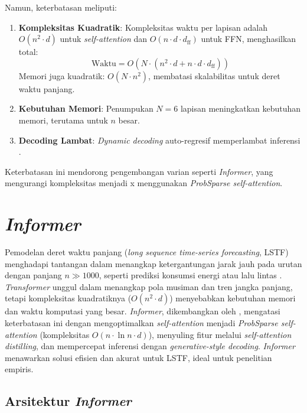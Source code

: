 Namun, keterbatasan meliputi:
\begin{enumerate}
    \item \textbf{Kompleksitas Kuadratik}: Kompleksitas waktu per lapisan adalah \( O(n^2 \cdot d) \) untuk \textit{self-attention} dan \( O(n \cdot d \cdot d_{\text{ff}}) \) untuk FFN, menghasilkan total:
    \begin{equation}
    \text{Waktu} = O(N \cdot (n^2 \cdot d + n \cdot d \cdot d_{\text{ff}}))
    \end{equation}
    Memori juga kuadratik: \( O(N \cdot n^2) \), membatasi skalabilitas untuk deret waktu panjang.
    \item \textbf{Kebutuhan Memori}: Penumpukan \( N=6 \) lapisan meningkatkan kebutuhan memori, terutama untuk \( n \) besar.
    \item \textbf{Decoding Lambat}: \textit{Dynamic decoding} auto-regresif memperlambat inferensi \citep{Zhou2021}.
\end{enumerate}
Keterbatasan ini mendorong pengembangan varian seperti \textit{Informer}, yang mengurangi kompleksitas menjadi x menggunakan \textit{ProbSparse self-attention}.

\section{\textit{Informer}}
\label{sec:informer}

Pemodelan deret waktu panjang (\textit{long sequence time-series forecasting}, LSTF) menghadapi tantangan dalam menangkap ketergantungan jarak jauh pada urutan dengan panjang \( n \gg 1000 \), seperti prediksi konsumsi energi atau lalu lintas \citep{Wu2021}. \textit{Transformer} \citep{Vaswani2017} unggul dalam menangkap pola musiman dan tren jangka panjang, tetapi kompleksitas kuadratiknya (\( O(n^2 \cdot d) \)) menyebabkan kebutuhan memori dan waktu komputasi yang besar. \textit{Informer}, dikembangkan oleh \citet{Zhou2021}, mengatasi keterbatasan ini dengan mengoptimalkan \textit{self-attention} menjadi \textit{ProbSparse self-attention} (kompleksitas \( O(n \cdot \ln n \cdot d) \)), menyuling fitur melalui \textit{self-attention distilling}, dan mempercepat inferensi dengan \textit{generative-style decoding}. \textit{Informer} menawarkan solusi efisien dan akurat untuk LSTF, ideal untuk penelitian empiris.

\subsection{Arsitektur \textit{Informer}}
\label{sec:informer_architecture}

